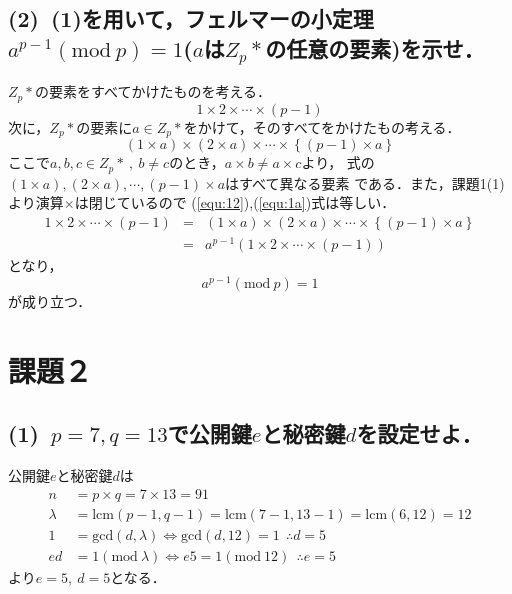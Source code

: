 \documentclass[a4paper,12pt]{jarticle}
\begin{document}
\subsection*{(2)~(1)を用いて，フェルマーの小定理$a^{p-1}(\mathrm{mod}~p)=1$($a$は$Z_p*$の任意の要素)を示せ．}
%
%
$Z_p*$の要素をすべてかけたものを考える．
%
\begin{equation} \label{equ:12}
 1 \times 2 \times \cdots \times (p-1) 
\end{equation}
%
次に，$Z_p*$の要素に$a\in Z_p*$をかけて，そのすべてをかけたもの考える．
%
\begin{equation} \label{equ:1a}
 (1 \times a)\times (2 \times a)
  \times \cdots \times \left\{ (p-1) \times a\right\}
\end{equation}
%
ここで$a,b,c\in Z_p*~,~b\neq c$のとき，$a \times b \neq a \times c$より，
式の$(1 \times a),(2 \times a),\cdots,(p-1) \times a$はすべて異なる要素
である．また，課題1(1)より演算$\times$は閉じているので
(\ref{equ:12}),(\ref{equ:1a})式は等しい．
%
\begin{eqnarray}
 1 \times 2 \times \cdots \times (p-1) &=& (1 \times a)\times (2 \times a)
  \times \cdots \times \left\{ (p-1) \times a\right\} \\
&=&a^{p-1}(1 \times 2 \times \cdots \times (p-1))
\end{eqnarray}
%
となり，
%
\begin{equation}
 a^{p-1} (\mathrm{mod}~p)=1
\end{equation}
%
が成り立つ．
\vspace{-10mm}
\section*{課題２}
\vspace{-3mm}
\subsection*{(1)~$p=7,q=13$で公開鍵$e$と秘密鍵$d$を設定せよ．}
公開鍵$e$と秘密鍵$d$は
%
\begin{align*}
  n&=p \times q = 7 \times 13 = 91 \\
 \lambda &= \mathrm{lcm}(p-1,q-1) = \mathrm{lcm}(7-1,13-1) =\mathrm{lcm}(6,12)=12 \\
 1&=\mathrm{gcd}(d,\lambda) \iff \mathrm{gcd}(d,12)=1 ~~\therefore d=5\\
 ed &= 1(\mathrm{mod}~\lambda) \iff e5=1(\mathrm{mod}~12) ~~\therefore e=5
\end{align*}
%
より$e=5,~d=5$となる．
\vspace{-6mm}
\end{document}
